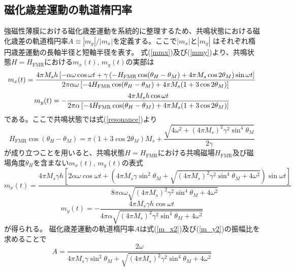 \subsection{磁化歳差運動の軌道楕円率}
強磁性薄膜における磁化歳差運動を系統的に整理するため、共鳴状態における磁化歳差の軌道楕円率$A\equiv |m_y|/|m_x|$を定義する。ここで$|m_x|$と$|m_y|$ はそれぞれ楕円歳差運動の長軸半径と短軸半径を表す。
式(\ref{mmx})及び(\ref{mmy})より、共鳴状態$H=H_\text{FMR}$における$m_x(t)$, $m_y(t)$の実部は
\begin{equation}
m_x (t) = \frac{{ 4\pi M_s h \left[ {-\alpha \omega \cos \omega t +\gamma\left(- H_{{\rm{FMR}}} \cos (\theta_H  - \theta_M ) + 4\pi M_s  \cos 2\theta_M\right) \sin \omega t} \right]}}{{2\pi \alpha  \omega \left[ {-4H_{{\rm{FMR}}}\cos (\theta_H  - \theta_M ) + 4\pi M_s ( 1 + 3\cos 2\theta_M )} \right]}}\label{m_x}
\end{equation}
\begin{equation}
m_y (t) =  - \frac{{4\pi M_s h \cos \omega t}}{{2\pi \alpha \left[ {-4H_{{\rm{FMR}}}\cos (\theta_H  - \theta_M ) + 4\pi M_s (  1 + 3\cos 2\theta_M )} \right]}}\label{m_y}
\end{equation}
である。ここで共鳴状態では式(\ref{resonance})より
\begin{equation}
H_\text{FMR}\cos(\theta_H-\theta_M)=\pi\left(1+3\cos2\theta_M\right) M_s+\frac{\sqrt{4\omega^2+(4\pi M_s)^2\gamma^2 \sin^4\theta_M}}{2\gamma}
\end{equation}
が成り立つことを用いると、共鳴状態$H=H_\text{FMR}$における共鳴磁場$H_\text{FMR}$及び磁場角度$\theta_H$を含まない$m_x(t)$, $m_y(t)$の表式
\begin{equation}
m_x (t) = \frac{4\pi M_s\gamma h \left[ 2\alpha \omega \cos \omega t +\left(4\pi M_s\gamma\sin^2\theta_M +\sqrt{(4\pi M_s)^2\gamma ^2 \sin ^4\theta_M+4
\omega ^2} \right) \sin \omega t \right]}{8\pi \alpha  \omega\sqrt{(4\pi M_s)^2\gamma ^2 \sin ^4\theta_M+4
\omega ^2}} \label{m_x2}
\end{equation}
\begin{equation}
m_y (t) =  - \frac{{4\pi M_s \gamma h \cos \omega t}}{4\pi \alpha \sqrt{(4\pi M_s)^2\gamma ^2 \sin ^4\theta_M+4
\omega ^2}}\label{m_y2}
\end{equation}
が得られる。
磁化歳差運動の軌道楕円率$A$は式(\ref{m_x2})及び(\ref{m_y2})の振幅比を求めることで
\begin{equation}
A=\frac{2 \omega }{4\pi M_s\gamma   \sin ^2\theta_M+\sqrt{ \left(4\pi M_s\right)^2\gamma ^2 \sin ^4\theta_M+4 \omega ^2}}\label{A}
\end{equation}

